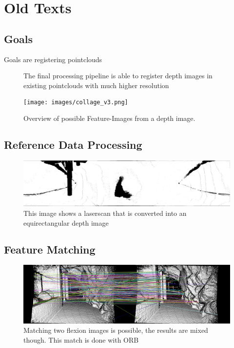 \section{Old Texts}
\subsection{Goals}

Goals are registering pointclouds

\begin{figure}[H]
    
	\caption[Flowchart of final processing pipeline]{The final processing pipeline is able to register depth images in existing pointclouds with much higher resolution}
\end{figure}

\begin{figure}[H]
    \centering
    \texttt{[image: images/collage\_v3.png]}
    \caption{Overview of possible Feature-Images from a depth image.}
\end{figure}

\subsection{Reference Data Processing}

\begin{figure}[H]
	\includegraphics[width=\linewidth]{images/bild1.png}
	\caption[Laserscan as equirectangular depth image]{This image shows a laserscan that is converted into an equirectangular depth image}
\end{figure}

\subsection{Feature Matching}

\begin{figure}[H]
	\includegraphics[width=\linewidth]{images/match-result.png}
	\caption[Examplaric Image Matching]{Matching two flexion images is possible, the results are mixed though. This match is done with ORB}
\end{figure}

